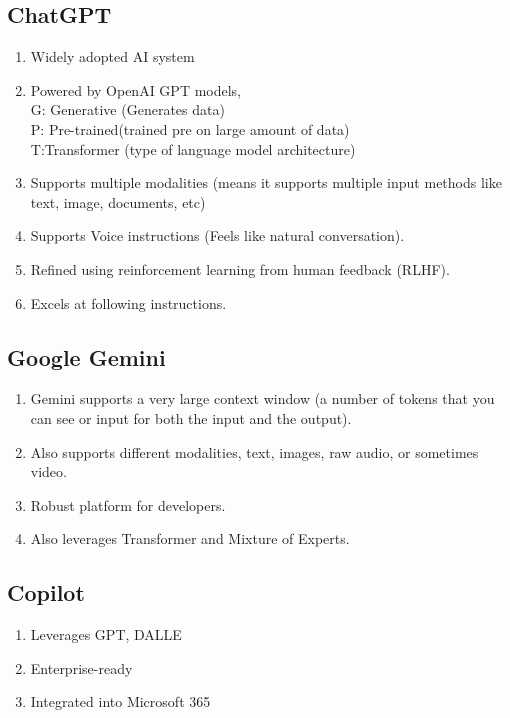 \subsection*{ChatGPT}
\begin{enumerate}
    \item Widely adopted AI system
    \item Powered by OpenAI GPT models, \\
    G: Generative (Generates data)\\
    P: Pre-trained(trained pre on large amount of data)\\
    T:Transformer (type of language model architecture)
    \item Supports multiple modalities (means it supports multiple input methods like text, image, documents, etc)
    \item Supports Voice instructions (Feels like natural conversation).
    \item Refined using reinforcement learning from human feedback (RLHF).
    \item Excels at following instructions.
\end{enumerate}

\subsection*{Google Gemini}
\begin{enumerate}
    \item Gemini supports a very large context window (a number of tokens that you can see or input for both the input and the output).
    \item Also supports different modalities, text, images, raw audio, or sometimes video.
    \item Robust platform for developers.
    \item Also leverages Transformer and Mixture of Experts.
\end{enumerate}

\subsection*{Copilot}
\begin{enumerate}
    \item Leverages GPT, DALL\cdot E
    \item Enterprise-ready
    \item Integrated into Microsoft 365
\end{enumerate}


